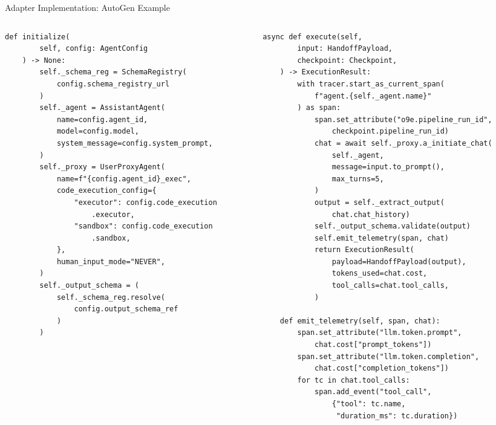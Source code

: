 \begin{frame}[fragile]{Adapter Implementation: AutoGen Example}
\begin{columns}[T]
\begin{column}{0.52\textwidth}
\begin{lstlisting}[style=pythonstyle,basicstyle=\ttfamily\fontsize{3.3}{4}\selectfont,title={\tiny\bfseries opencollage/adapters/autogen\_adapter.py}]
    def initialize(
        self, config: AgentConfig
    ) -> None:
        self._schema_reg = SchemaRegistry(
            config.schema_registry_url
        )
        self._agent = AssistantAgent(
            name=config.agent_id,
            model=config.model,
            system_message=config.system_prompt,
        )
        self._proxy = UserProxyAgent(
            name=f"{config.agent_id}_exec",
            code_execution_config={
                "executor": config.code_execution
                    .executor,
                "sandbox": config.code_execution
                    .sandbox,
            },
            human_input_mode="NEVER",
        )
        self._output_schema = (
            self._schema_reg.resolve(
                config.output_schema_ref
            )
        )
      \end{lstlisting}
    \end{column}
    \begin{column}{0.48\textwidth}
      \begin{lstlisting}[style=pythonstyle,basicstyle=\ttfamily\fontsize{3.3}{4}\selectfont,title={\tiny\bfseries execute() and emit\_telemetry()}]
    async def execute(self,
        input: HandoffPayload,
        checkpoint: Checkpoint,
    ) -> ExecutionResult:
        with tracer.start_as_current_span(
            f"agent.{self._agent.name}"
        ) as span:
            span.set_attribute("o9e.pipeline_run_id",
                checkpoint.pipeline_run_id)
            chat = await self._proxy.a_initiate_chat(
                self._agent,
                message=input.to_prompt(),
                max_turns=5,
            )
            output = self._extract_output(
                chat.chat_history)
            self._output_schema.validate(output)
            self.emit_telemetry(span, chat)
            return ExecutionResult(
                payload=HandoffPayload(output),
                tokens_used=chat.cost,
                tool_calls=chat.tool_calls,
            )

    def emit_telemetry(self, span, chat):
        span.set_attribute("llm.token.prompt",
            chat.cost["prompt_tokens"])
        span.set_attribute("llm.token.completion",
            chat.cost["completion_tokens"])
        for tc in chat.tool_calls:
            span.add_event("tool_call",
                {"tool": tc.name,
                 "duration_ms": tc.duration})
      \end{lstlisting}
    \end{column}
  \end{columns}
\end{frame}

